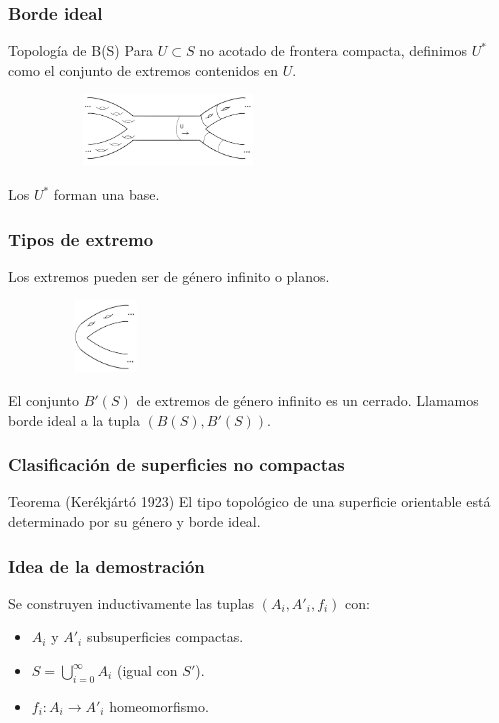 \documentclass{beamer}
\begin{document}
\begin{frame}
\frametitle{Borde ideal}
\begin{block}
{Topología de B(S)}
Para $U \subset S$ no acotado de frontera compacta, definimos $U^*$ como el conjunto de extremos contenidos en $U$. 
\begin{figure}[htb]
\begin{center}
\includegraphics[width=2.5in,height=0.75in]{imagenes/diapoX.png} 
\end{center}
\end{figure}

Los $U^*$ forman una base.
\end{block}

\end{frame}

\begin{frame}
\frametitle{Tipos de extremo}

Los extremos pueden ser de género infinito o planos.
\begin{figure}[htb]
\begin{center}
\includegraphics[width=1.2in,height=0.75in]{imagenes/dosfinales.png} 
\end{center}
\end{figure}

El conjunto $B'(S)$  de extremos de género infinito es un cerrado. Llamamos borde ideal a la tupla $(B(S), B'(S))$.
\end{frame}
 

\begin{frame}
\frametitle{Clasificación de superficies no compactas}

\begin{block}{Teorema (Kerékjártó 1923)}
El tipo topológico de una superficie orientable está determinado por su género y borde ideal.
\end{block}
\end{frame}

\begin{frame}

\frametitle{Idea de la demostración}
Se construyen inductivamente las tuplas $(A_i, A'_i, f_i)$ con:
\begin{itemize}
\item $A_i$ y $A'_i$  subsuperficies compactas.
\item $S = \bigcup_{i=0}^{\infty}A_i$  (igual con $S'$).
\item $f_i: A_i \longrightarrow A'_i$ homeomorfismo.
\end{itemize}

\end{frame}
\end{document}
